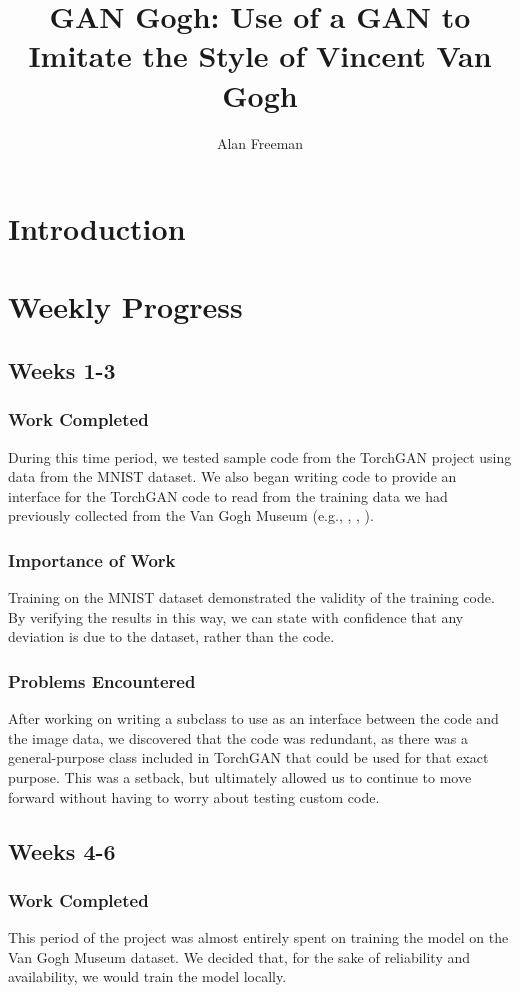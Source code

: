 \documentclass[12pt,letterpaper]{article}
\author{Alan Freeman}
\title{GAN Gogh: Use of a GAN to Imitate the Style of Vincent Van Gogh}
\begin{document}
	\maketitle
	\section{Introduction}

	\section{Weekly Progress}
	\subsection{Weeks 1-3}
	\subsubsection{Work Completed}
	During this time period, we tested sample code from the TorchGAN\cite{pal2019torchgan} project using data from the MNIST\cite{lecun2010mnist} dataset.
	We also began writing code to provide an interface for the TorchGAN code to read from the training data we had previously collected from the Van Gogh Museum (e.g., \cite{001}, \cite{002}, \cite{003}).

	\subsubsection{Importance of Work}
	Training on the MNIST dataset demonstrated the validity of the training code.
	By verifying the results in this way, we can state with confidence that any deviation is due to the dataset, rather than the code.

	\subsubsection{Problems Encountered}
	After working on writing a subclass to use as an interface between the code and the image data, we discovered that the code was redundant, as there was a general-purpose class included in TorchGAN that could be used for that exact purpose.
	This was a setback, but ultimately allowed us to continue to move forward without having to worry about testing custom code.

	\subsection{Weeks 4-6}
	\subsubsection{Work Completed}
	This period of the project was almost entirely spent on training the model on the Van Gogh Museum dataset.
	We decided that, for the sake of reliability and availability, we would train the model locally.
\end{document}
